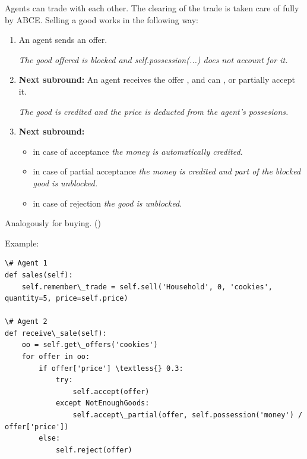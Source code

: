 \documentclass[letterpaper,10pt,english]{sphinxmanual}
\begin{document}
\begin{fulllineitems}
\label{Trade:abce.Trade}
Agents can trade with each other. The clearing of the trade is taken care
of fully by ABCE.
Selling a good works in the following way:
\begin{enumerate}
\item {} 
An agent sends an offer. 

\emph{The good offered is blocked and self.possession(...) does not account for it.}

\item {} 
\textbf{Next subround:} An agent receives the offer , and can
,  or partially accept it. 

\emph{The good is credited and the price is deducted from the agent's possesions.}

\item {} 
\textbf{Next subround:}
\begin{itemize}
\item {} 
in case of acceptance \emph{the money is automatically credited.}

\item {} 
in case of partial acceptance \emph{the money is credited and part of the blocked good is unblocked.}

\item {} 
in case of rejection \emph{the good is unblocked.}

\end{itemize}

\end{enumerate}

Analogously for buying. ()

Example:

\begin{Verbatim}[commandchars=\\\{\}]
\# Agent 1
def sales(self):
    self.remember\_trade = self.sell('Household', 0, 'cookies', quantity=5, price=self.price)

\# Agent 2
def receive\_sale(self):
    oo = self.get\_offers('cookies')
    for offer in oo:
        if offer['price'] \textless{} 0.3:
            try:
                self.accept(offer)
            except NotEnoughGoods:
                self.accept\_partial(offer, self.possession('money') / offer['price'])
        else:
            self.reject(offer)


\end{Verbatim}
\end{fulllineitems}
\end{document}
